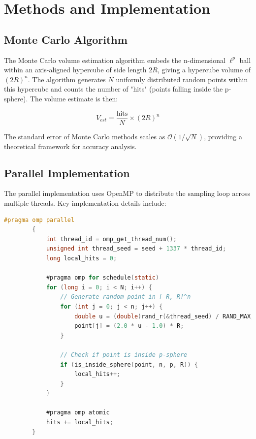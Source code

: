 \documentclass[11pt,a4paper]{article}
\begin{document}
	\section{Methods and Implementation}
	
	\subsection{Monte Carlo Algorithm}
	
	The Monte Carlo volume estimation algorithm embeds the n-dimensional $\ell^p$ ball within an axis-aligned hypercube of side length $2R$, giving a hypercube volume of $(2R)^n$. The algorithm generates $N$ uniformly distributed random points within this hypercube and counts the number of "hits" (points falling inside the p-sphere). The volume estimate is then:
	
	\begin{equation}\label{eq:monte_carlo_estimate}
		V_{est} = \frac{\text{hits}}{N} \times (2R)^n
	\end{equation}
	
	The standard error of Monte Carlo methods scales as $\mathcal{O}(1/\sqrt{N})$, providing a theoretical framework for accuracy analysis.
	
	\subsection{Parallel Implementation}
	
	The parallel implementation uses OpenMP to distribute the sampling loop across multiple threads. Key implementation details include:
	
	\begin{lstlisting}[language=C, caption={Core parallel sampling loop structure}, label={lst:parallel_core}]
		#pragma omp parallel
		{
			int thread_id = omp_get_thread_num();
			unsigned int thread_seed = seed + 1337 * thread_id;
			long local_hits = 0;
			
			#pragma omp for schedule(static)
			for (long i = 0; i < N; i++) {
				// Generate random point in [-R, R]^n
				for (int j = 0; j < n; j++) {
					double u = (double)rand_r(&thread_seed) / RAND_MAX;
					point[j] = (2.0 * u - 1.0) * R;
				}
				
				// Check if point is inside p-sphere
				if (is_inside_sphere(point, n, p, R)) {
					local_hits++;
				}
			}
			
			#pragma omp atomic
			hits += local_hits;
		}
	\end{lstlisting}
	
\end{document}
